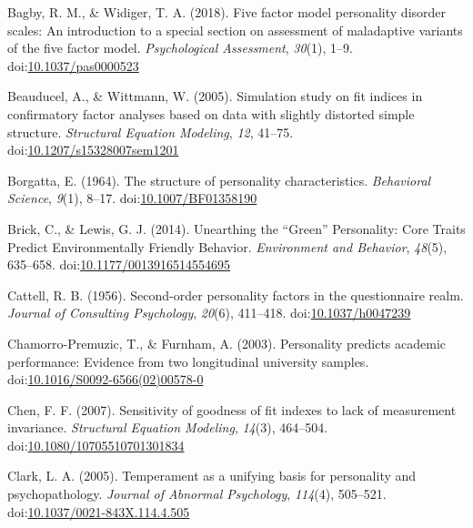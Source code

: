 \documentclass[,man,floatsintext]{apa6}
\theoremstyle{definition}
\theoremstyle{definition}
\theoremstyle{definition}
\theoremstyle{remark}
\begin{document}
\leavevmode\hypertarget{ref-Bagby2018}{}%
Bagby, R. M., \& Widiger, T. A. (2018). Five factor model personality
disorder scales: An introduction to a special section on assessment of
maladaptive variants of the five factor model. \emph{Psychological
Assessment}, \emph{30}(1), 1--9.
doi:\href{https://doi.org/10.1037/pas0000523}{10.1037/pas0000523}

\leavevmode\hypertarget{ref-Beauducel2005}{}%
Beauducel, A., \& Wittmann, W. (2005). Simulation study on fit indices
in confirmatory factor analyses based on data with slightly distorted
simple structure. \emph{Structural Equation Modeling}, \emph{12},
41--75.
doi:\href{https://doi.org/10.1207/s15328007sem1201}{10.1207/s15328007sem1201}

\leavevmode\hypertarget{ref-Borgatta1964}{}%
Borgatta, E. (1964). The structure of personality characteristics.
\emph{Behavioral Science}, \emph{9}(1), 8--17.
doi:\href{https://doi.org/10.1007/BF01358190}{10.1007/BF01358190}

\leavevmode\hypertarget{ref-Brick2014}{}%
Brick, C., \& Lewis, G. J. (2014). Unearthing the ``Green'' Personality:
Core Traits Predict Environmentally Friendly Behavior. \emph{Environment
and Behavior}, \emph{48}(5), 635--658.
doi:\href{https://doi.org/10.1177/0013916514554695}{10.1177/0013916514554695}

\leavevmode\hypertarget{ref-Cattell1956}{}%
Cattell, R. B. (1956). Second-order personality factors in the
questionnaire realm. \emph{Journal of Consulting Psychology},
\emph{20}(6), 411--418.
doi:\href{https://doi.org/10.1037/h0047239}{10.1037/h0047239}

\leavevmode\hypertarget{ref-Chamorro-Premuzic2003}{}%
Chamorro-Premuzic, T., \& Furnham, A. (2003). Personality predicts
academic performance: Evidence from two longitudinal university samples.
doi:\href{https://doi.org/10.1016/S0092-6566(02)00578-0}{10.1016/S0092-6566(02)00578-0}

\leavevmode\hypertarget{ref-Chen2007}{}%
Chen, F. F. (2007). Sensitivity of goodness of fit indexes to lack of
measurement invariance. \emph{Structural Equation Modeling},
\emph{14}(3), 464--504.
doi:\href{https://doi.org/10.1080/10705510701301834}{10.1080/10705510701301834}

\leavevmode\hypertarget{ref-Clark2005}{}%
Clark, L. A. (2005). Temperament as a unifying basis for personality and
psychopathology. \emph{Journal of Abnormal Psychology}, \emph{114}(4),
505--521.
doi:\href{https://doi.org/10.1037/0021-843X.114.4.505}{10.1037/0021-843X.114.4.505}
\end{document}
